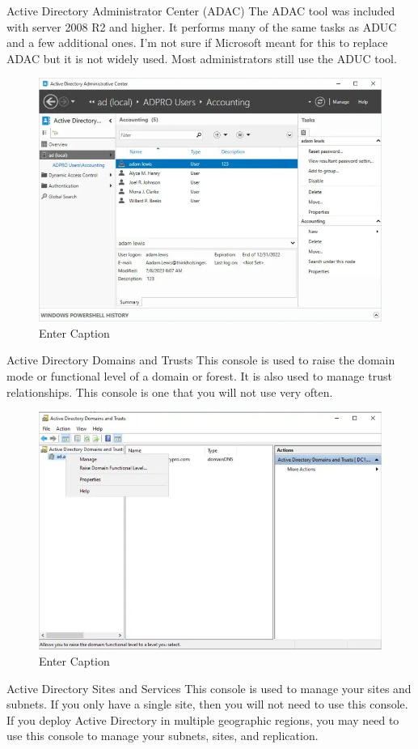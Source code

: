Active Directory Administrator Center (ADAC)
The ADAC tool was included with server 2008 R2 and higher. It performs many of the same tasks as ADUC and a few additional ones. I’m not sure if Microsoft meant for this to replace ADAC but it is not widely used. Most administrators still use the ADUC tool.

\begin{figure}
    \centering
    \includegraphics[width=0.75\linewidth]{adac.png}
    \caption{Enter Caption}
    \label{fig:placeholder}
\end{figure}

Active Directory Domains and Trusts
This console is used to raise the domain mode or functional level of a domain or forest. It is also used to manage trust relationships. This console is one that you will not use very often.

\begin{figure}
    \centering
    \includegraphics[width=0.75\linewidth]{domtrust.png}
    \caption{Enter Caption}
    \label{fig:placeholder}
\end{figure}

Active Directory Sites and Services
This console is used to manage your sites and subnets. If you only have a single site, then you will not need to use this console. If you deploy Active Directory in multiple geographic regions, you may need to use this console to manage your subnets, sites, and replication.

